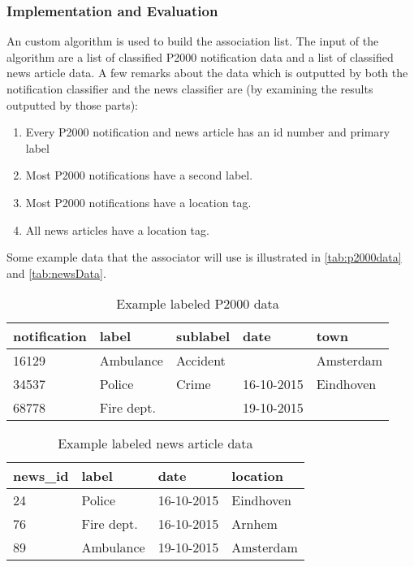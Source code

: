 \subsubsection*{Implementation and Evaluation }
An custom algorithm is used to build the association list. The input of the algorithm are a list of classified P2000 notification data and a list of classified news article data. A few remarks about the data which is outputted by both the notification classifier and the news classifier are (by examining the results outputted by those parts):
\begin{enumerate}
\item Every P2000 notification and news article has an id number and primary label
\item Most P2000 notifications have a second label. 
\item Most P2000 notifications have a location tag.
\item All news articles have a location tag.
\end{enumerate}

Some example data that the associator will use is illustrated in \autoref{tab:p2000data} and \autoref{tab:newsData}. 
\begin{table}[]
\centering
\begin{tabular}{|l|l|l|l|l|}
\hline
\textbf{notification} & \textbf{label} & \textbf{sublabel} & \textbf{date} & \textbf{town} \\ \hline
16129                 & Ambulance      & Accident          &               & Amsterdam     \\ \hline
34537                 & Police         & Crime             & 16-10-2015    & Eindhoven     \\ \hline
68778                 & Fire dept.     &                   & 19-10-2015    &               \\ \hline
\end{tabular}
\caption{Example labeled P2000 data}
\label{tab:p2000data}
\end{table}

\begin{table}[]
\centering
\begin{tabular}{|l|l|l|l|}
\hline
\textbf{news\_id} & \textbf{label} & \textbf{date} & \textbf{location} \\ \hline
24                & Police         &  16-10-2015             & Eindhoven         \\ \hline
76                & Fire dept.     & 16-10-2015    & Arnhem         \\ \hline
89                & Ambulance      & 19-10-2015    & Amsterdam            \\ \hline
\end{tabular}
\caption{Example labeled news article data}
\label{tab:newsData}
\end{table}

